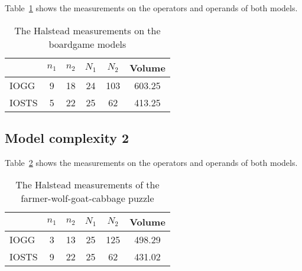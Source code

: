 Table~\ref{tab:halstead-bg} shows the measurements on the operators and operands of both models.

\begin{table}[ht]
\begin{center}
\begin{tabular}{| l | c | c | c | c | c |}
  \hline
  & $n_1$ & $n_2$ & $N_1$ & $N_2$ & Volume \\ \hline
  IOGG & 9 & 18 & 24 & 103 & 603.25 \\ \hline
  IOSTS & 5 & 22 & 25 & 62 & 413.25 \\
  \hline
\end{tabular}
\end{center}
\caption{The Halstead measurements on the boardgame models}
\label{tab:halstead-bg}
\end{table}

\subsection{Model complexity 2}
\begin{comment}
start: 12 new operands, 26 operands
?c: 3 new operators, 0 new operands. 5 operators, 17 operands
?c-invalid: 0 new operators, 1 new operand. 2 operators, 14 operands
!retry: 0-0. 1 operator, 2 operands.
!eaten: 0-0. 9 operators, 36 operands
!done: 8 operators, 30 operands
\end{comment}

Table~\ref{tab:halstead-fwgc} shows the measurements on the operators and operands of both models.

\begin{table}[ht]
\begin{center}
\begin{tabular}{| l | c | c | c | c | c |}
  \hline
  & $n_1$ & $n_2$ & $N_1$ & $N_2$ & Volume \\ \hline
  IOGG & 3 & 13 & 25 & 125 & 498.29 \\ \hline
  IOSTS & 9 & 22 & 25 & 62 & 431.02 \\
  \hline
\end{tabular}
\end{center}
\caption{The Halstead measurements of the farmer-wolf-goat-cabbage puzzle}
\label{tab:halstead-fwgc}
\end{table}

